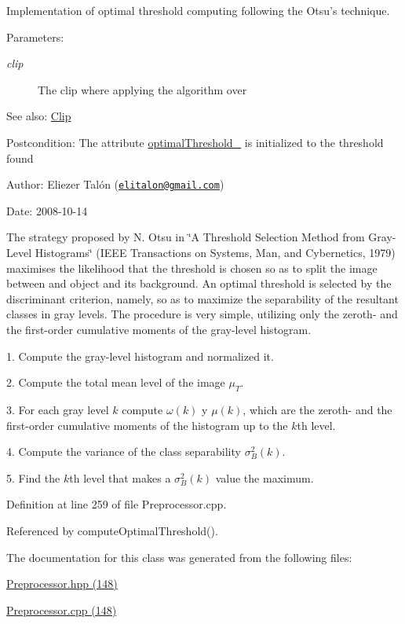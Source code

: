Implementation of optimal threshold computing following the Otsu's technique. 

\begin{Desc}
\item[Parameters:]
\begin{description}
\item[{\em clip}]The clip where applying the algorithm over\end{description}
\end{Desc}
\begin{Desc}
\item[See also:]\hyperlink{class_clip}{Clip}\end{Desc}
\begin{Desc}
\item[Postcondition:]The attribute \hyperlink{class_preprocessor_865b1e28dd9535b96f70727a550104fe}{optimalThreshold\_\-} is initialized to the threshold found\end{Desc}
\begin{Desc}
\item[Author:]Eliezer Talón (\href{mailto:elitalon@gmail.com}{\tt elitalon@gmail.com}) \end{Desc}
\begin{Desc}
\item[Date:]2008-10-14\end{Desc}
The strategy proposed by N. Otsu in \char`\"{}A Threshold Selection Method from Gray-Level Histograms\char`\"{} (IEEE Transactions on Systems, Man, and Cybernetics, 1979) maximises the likelihood that the threshold is chosen so as to split the image between and object and its background. An optimal threshold is selected by the discriminant criterion, namely, so as to maximize the separability of the resultant classes in gray levels. The procedure is very simple, utilizing only the zeroth- and the first-order cumulative moments of the gray-level histogram. 

1. Compute the gray-level histogram and normalized it.

2. Compute the total mean level of the image $\mu_T$.

3. For each gray level $k$ compute $\omega(k)$ y $\mu(k)$, which are the zeroth- and the first-order cumulative moments of the histogram up to the $k$th level.

4. Compute the variance of the class separability $\sigma_B^2(k)$.

5. Find the $k$th level that makes a $\sigma_B^2(k)$ value the maximum. 

Definition at line 259 of file Preprocessor.cpp.

Referenced by computeOptimalThreshold().

The documentation for this class was generated from the following files:\begin{CompactItemize}
\item 
\hyperlink{_preprocessor_8hpp}{Preprocessor.hpp (148)}\item 
\hyperlink{_preprocessor_8cpp}{Preprocessor.cpp (148)}\end{CompactItemize}

